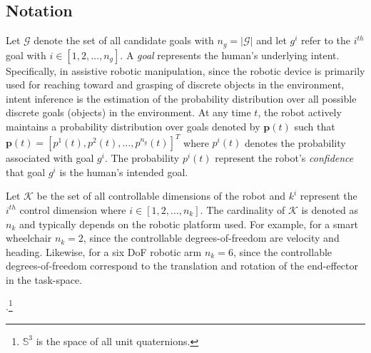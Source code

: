 \documentclass[natbib, twocolumn]{svjour3}          %
\begin{document}
\subsection{Notation}\label{ssec:notation}
Let $\mathcal{G}$ denote the set of all candidate goals with $n_g = \vert\mathcal{G}\vert$ and let $g^i$ refer to the $i^{th}$ goal with $i \in [1,2,\dots, n_g]$. A \textit{goal} represents the human's underlying intent. Specifically, in assistive robotic manipulation, since the robotic device is primarily used for reaching toward and grasping of discrete objects in the environment, intent inference is the estimation of the probability distribution over all possible discrete goals (objects) in the environment. At any time $t$, the robot actively maintains a probability distribution over goals denoted by $\boldsymbol{p}(t)$ such that $\boldsymbol{p}(t) = [p^1(t), p^2(t),\dots, p^{n_g}(t)]^{T}$ where $p^i(t)$ denotes the probability associated with goal $g^i$.  The probability $p^i(t)$ represent the robot's \textit{confidence} that goal $g^i$ is the human's intended goal. 

Let $\mathcal{K}$ be the set of all controllable dimensions of the robot and $k^i$ represent the $i^{th}$ control dimension where $i \in [1,2,\dots,n_k]$. The cardinality of $\mathcal{K}$ is denoted as $n_k$ and typically depends on the robotic platform used. For example, for a smart wheelchair $n_k = 2$, since the controllable degrees-of-freedom are velocity and heading. Likewise, for a six DoF robotic arm $n_k = 6$, since the controllable degrees-of-freedom correspond to the translation and rotation of the end-effector in the task-space. 

.\footnote{$\mathbb{S}^3$ is the space of all unit quaternions.} 
\end{document}
